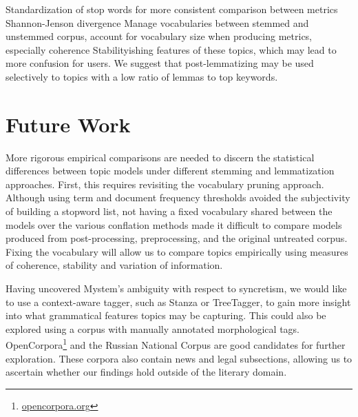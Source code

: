 \documentclass[11pt,a4paper]{article}
\begin{document}
Standardization of stop words for more consistent comparison between metrics
Shannon-Jenson divergence
Manage vocabularies between stemmed and unstemmed corpus, account for vocabulary size when producing metrics, especially coherence
Stabilityishing features of these topics, which may lead to more confusion for users. We suggest that post-lemmatizing may be used selectively to topics with a low ratio of lemmas to top keywords.

\section{Future Work}
More rigorous empirical comparisons are needed to discern the statistical differences between topic models under different stemming and lemmatization approaches. First, this requires revisiting the vocabulary pruning approach. Although using term and document frequency thresholds avoided the subjectivity of building a stopword list, not having a fixed vocabulary shared between the models over the various conflation methods made it difficult to compare models produced from post-processing, preprocessing, and the original untreated corpus. Fixing the vocabulary will allow us to compare topics empirically using measures of coherence, stability and variation of information.

Having uncovered Mystem's ambiguity with respect to syncretism, we would like to use a context-aware tagger, such as Stanza or TreeTagger, to gain more insight into what grammatical features topics may be capturing. This could also be explored using a corpus with manually annotated morphological tags. OpenCorpora\footnote{\url{opencorpora.org}} and the Russian National Corpus are good candidates for further exploration. These corpora also contain news and legal subsections, allowing us to ascertain whether our findings hold outside of the literary domain.




\appendix
\onecolumn
\end{document}
